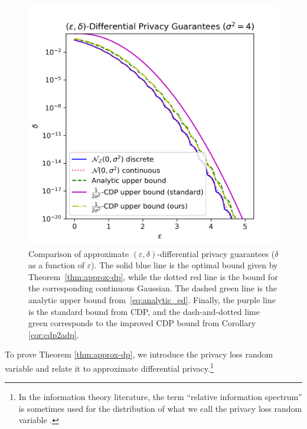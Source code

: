 \documentclass{jpcfinal} %
\newcommand{\eps}{\varepsilon}
\begin{document}
\begin{figure}[ht!]
\begin{minipage}{0.5\textwidth}
        \includegraphics[width=\textwidth]{dg_epsdelta2.png}
    \end{minipage}
    \caption{\label{fig:epsdelta} Comparison of approximate $(\eps,\delta)$-differential privacy guarantees ($\delta$ as a function of $\eps$). The solid blue line is the optimal bound given by Theorem~\ref{thm:approx-dp}, while the dotted red line is the bound for the corresponding continuous Gaussian. The dashed green line is the analytic upper bound from~\eqref{eq:analytic_ed}. Finally, the purple line is the standard bound from CDP, and the dash-and-dotted lime green corresponds to the improved CDP bound from Corollary \ref{cor:cdp2adp}.}\label{fig:my_label}
\end{figure}

To prove Theorem \ref{thm:approx-dp}, we introduce the privacy loss random variable \citep{DworkRV10,DworkR16,BunS16} and relate it to approximate differential privacy.\footnote{In the information theory literature, the term ``relative information spectrum'' is sometimes used for the distribution of what we call the privacy loss random variable \citep{SasonV16,Liu18}.}
\end{document}
